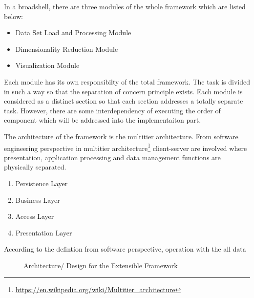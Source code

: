 In a broadshell, there are three modules of the whole framework which are listed below:
\begin{itemize}
	\item Data Set Load and Processing Module
	\item Dimensionality Reduction Module
	\item Visualization Module
\end{itemize}

Each module has its own responsibilty of the total framework. The task is divided in such a way so that the separation of concern principle exists. Each module is considered as a distinct section so that each section addresses a totally separate task. However, there are some interdependency of executing the order of component which will be addressed into the implementaiton part.

The architecture of the framework is the multitier architecture. From software engineering perspective in multitier architecture\footnote{\url{https://en.wikipedia.org/wiki/Multitier_architecture}} client-server are involved where presentation, application processing and data management functions are physically separated.
\begin{enumerate}
	\item Persistence Layer
	\item Business Layer
	\item Access Layer
	\item Presentation Layer
\end{enumerate}

According to the defintion from software perspective,  operation with the all data 

\begin{figure}[htbp]
	\centering
	
	
	\caption{Architecture/ Design for the Extensible Framework}
	\label{fig:labelOfThesisFlowChart}
\end{figure}

